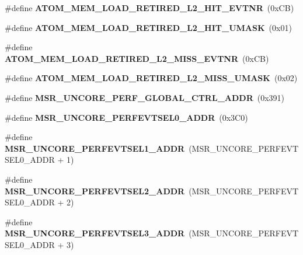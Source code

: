 \begin{DoxyCompactItemize}
\item 
\#define {\bfseries A\+T\+O\+M\+\_\+\+M\+E\+M\+\_\+\+L\+O\+A\+D\+\_\+\+R\+E\+T\+I\+R\+E\+D\+\_\+\+L2\+\_\+\+H\+I\+T\+\_\+\+E\+V\+T\+N\+R}~(0x\+C\+B)\label{types_8h_ae22b6f56994cf7ace060db72ae78ed02}

\item 
\#define {\bfseries A\+T\+O\+M\+\_\+\+M\+E\+M\+\_\+\+L\+O\+A\+D\+\_\+\+R\+E\+T\+I\+R\+E\+D\+\_\+\+L2\+\_\+\+H\+I\+T\+\_\+\+U\+M\+A\+S\+K}~(0x01)\label{types_8h_a692622a84797600e7b04df9a1eacc475}

\item 
\#define {\bfseries A\+T\+O\+M\+\_\+\+M\+E\+M\+\_\+\+L\+O\+A\+D\+\_\+\+R\+E\+T\+I\+R\+E\+D\+\_\+\+L2\+\_\+\+M\+I\+S\+S\+\_\+\+E\+V\+T\+N\+R}~(0x\+C\+B)\label{types_8h_a3c0d272f11177100e9b18f3772efe0e2}

\item 
\#define {\bfseries A\+T\+O\+M\+\_\+\+M\+E\+M\+\_\+\+L\+O\+A\+D\+\_\+\+R\+E\+T\+I\+R\+E\+D\+\_\+\+L2\+\_\+\+M\+I\+S\+S\+\_\+\+U\+M\+A\+S\+K}~(0x02)\label{types_8h_a61f57e34652a6d1477797b48401801da}

\item 
\#define {\bfseries M\+S\+R\+\_\+\+U\+N\+C\+O\+R\+E\+\_\+\+P\+E\+R\+F\+\_\+\+G\+L\+O\+B\+A\+L\+\_\+\+C\+T\+R\+L\+\_\+\+A\+D\+D\+R}~(0x391)\label{types_8h_af3f19ae0e002a60fd6546e040b0c5159}

\item 
\#define {\bfseries M\+S\+R\+\_\+\+U\+N\+C\+O\+R\+E\+\_\+\+P\+E\+R\+F\+E\+V\+T\+S\+E\+L0\+\_\+\+A\+D\+D\+R}~(0x3\+C0)\label{types_8h_a7e48eb341897b28179bcaa5b70b3c552}

\item 
\#define {\bfseries M\+S\+R\+\_\+\+U\+N\+C\+O\+R\+E\+\_\+\+P\+E\+R\+F\+E\+V\+T\+S\+E\+L1\+\_\+\+A\+D\+D\+R}~(M\+S\+R\+\_\+\+U\+N\+C\+O\+R\+E\+\_\+\+P\+E\+R\+F\+E\+V\+T\+S\+E\+L0\+\_\+\+A\+D\+D\+R + 1)\label{types_8h_aa5b503ab3f1be74c238ee87df2227c32}

\item 
\#define {\bfseries M\+S\+R\+\_\+\+U\+N\+C\+O\+R\+E\+\_\+\+P\+E\+R\+F\+E\+V\+T\+S\+E\+L2\+\_\+\+A\+D\+D\+R}~(M\+S\+R\+\_\+\+U\+N\+C\+O\+R\+E\+\_\+\+P\+E\+R\+F\+E\+V\+T\+S\+E\+L0\+\_\+\+A\+D\+D\+R + 2)\label{types_8h_a0e259eb9e97c5a62f776c2d55cd5dede}

\item 
\#define {\bfseries M\+S\+R\+\_\+\+U\+N\+C\+O\+R\+E\+\_\+\+P\+E\+R\+F\+E\+V\+T\+S\+E\+L3\+\_\+\+A\+D\+D\+R}~(M\+S\+R\+\_\+\+U\+N\+C\+O\+R\+E\+\_\+\+P\+E\+R\+F\+E\+V\+T\+S\+E\+L0\+\_\+\+A\+D\+D\+R + 3)\label{types_8h_a61a090a6079a203a639a1c7c7310e1bd}


\end{DoxyCompactItemize}
